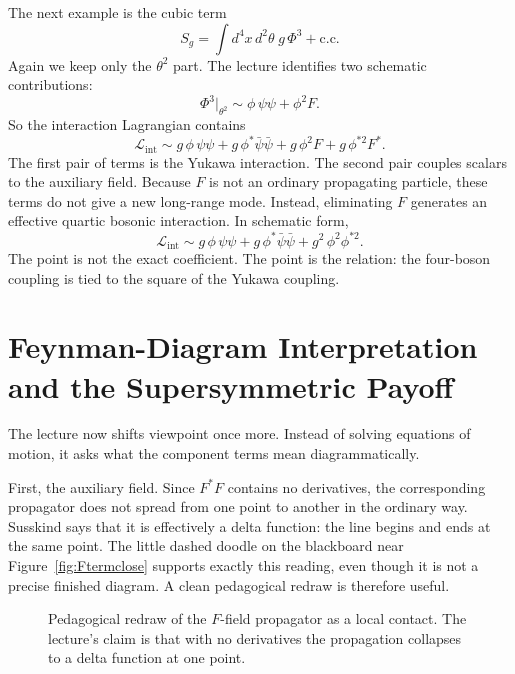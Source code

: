 The next example is the cubic term
\begin{equation}
S_g=\int d^4x\,d^2\theta\;g\,\Phi^3+\mathrm{c.c.}
\end{equation}
Again we keep only the \(\theta^2\) part. The lecture identifies two schematic contributions:
\begin{equation}
\Phi^3\big|_{\theta^2}\sim \phi\,\psi\psi+\phi^2F.
\end{equation}
So the interaction Lagrangian contains
\begin{equation}
\mathcal L_{\mathrm{int}}
\sim
g\,\phi\,\psi\psi
+
g\,\phi^\ast\bar\psi\bar\psi
+
g\,\phi^2F
+
g\,\phi^{\ast 2}F^\ast.
\end{equation}
The first pair of terms is the Yukawa interaction. The second pair couples scalars to the auxiliary field. Because \(F\) is not an ordinary propagating particle, these terms do not give a new long-range mode. Instead, eliminating \(F\) generates an effective quartic bosonic interaction. In schematic form,
\begin{equation}
\mathcal L_{\mathrm{int}}
\sim
g\,\phi\,\psi\psi
+
g\,\phi^\ast\bar\psi\bar\psi
+
g^2\,\phi^2\phi^{\ast 2}.
\end{equation}
The point is not the exact coefficient. The point is the relation: the four-boson coupling is tied to the square of the Yukawa coupling.

\section{Feynman-Diagram Interpretation and the Supersymmetric Payoff}

The lecture now shifts viewpoint once more. Instead of solving equations of motion, it asks what the component terms mean diagrammatically.

First, the auxiliary field. Since \(F^\ast F\) contains no derivatives, the corresponding propagator does not spread from one point to another in the ordinary way. Susskind says that it is effectively a delta function: the line begins and ends at the same point. The little dashed doodle on the blackboard near Figure~\ref{fig:Ftermclose} supports exactly this reading, even though it is not a precise finished diagram. A clean pedagogical redraw is therefore useful.

\begin{figure}
\centering
{}
\caption{Pedagogical redraw of the \(F\)-field propagator as a local contact. The lecture's claim is that with no derivatives the propagation collapses to a delta function at one point.}
\end{figure}

